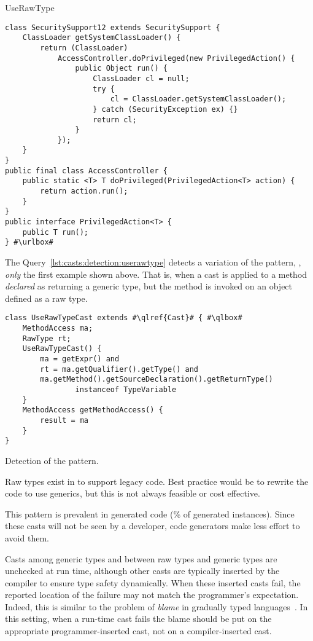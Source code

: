 \begin{pattern}{UseRawType}
\def\urlvar{http://bit.ly/robovm_robovm_2FAI5x5}
\begin{verbatim}
class SecuritySupport12 extends SecuritySupport {
    ClassLoader getSystemClassLoader() {
        return (ClassLoader)
            AccessController.doPrivileged(new PrivilegedAction() {
                public Object run() {
                    ClassLoader cl = null;
                    try {
                        cl = ClassLoader.getSystemClassLoader();
                    } catch (SecurityException ex) {}
                    return cl;
                }
            });
    }
}
public final class AccessController {
    public static <T> T doPrivileged(PrivilegedAction<T> action) {
        return action.run();
    }
}
public interface PrivilegedAction<T> {
    public T run();
} #\urlbox#
\end{verbatim}


\detection{}
The Query~\ref{lst:casts:detection:userawtype} detects a variation of the \thisp{} pattern, \eg{}, \emph{only} the first example shown above.
That is, when a cast is applied to a method \emph{declared} as returning a generic type,
but the method is invoked on an object defined as a raw type.

\begin{listing}
\begin{verbatim}
class UseRawTypeCast extends #\qlref{Cast}# { #\qlbox#
	MethodAccess ma;
	RawType rt;
	UseRawTypeCast() {
		ma = getExpr() and
		rt = ma.getQualifier().getType() and
		ma.getMethod().getSourceDeclaration().getReturnType()
				instanceof TypeVariable
	}
	MethodAccess getMethodAccess() {
		result = ma
	}
}
\end{verbatim}
\caption{Detection of the \thisp{} pattern.}
\label{lst:casts:detection:userawtype}
\end{listing}


\issues{}
Raw types exist in \java{} to support legacy code.
Best practice would be to rewrite the code to use generics,
but this is not always feasible or cost effective.

This pattern is prevalent in generated code
(\nUseRawTypePatternGenPerc{}\% of generated instances).
Since these casts will not be seen by a developer,
code generators make less effort to avoid them.

Casts among generic types and between raw types and generic types are unchecked at run time,
although other casts are typically inserted by the compiler to ensure type safety dynamically.
When these inserted casts fail, the reported location of the failure may not match the programmer's expectation.
Indeed, this is similar to the problem of \emph{blame} in gradually typed languages~\citep{wadlerWellTypedProgramsCan2009}.
In this setting, when a run-time cast fails the blame should be put on the appropriate programmer-inserted cast,
not on a compiler-inserted cast.

\end{pattern}
